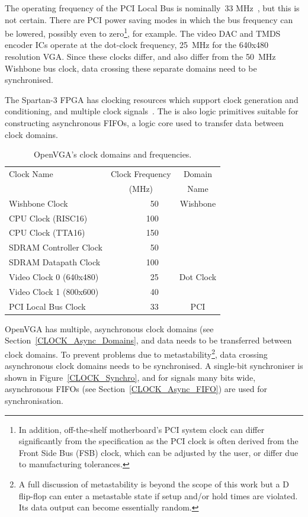 The operating frequency of the PCI Local Bus is nominally~33 MHz~\cite{PCI_Book},
but this is not certain. There are PCI power saving modes in which the bus
frequency can be lowered, possibly even to zero\footnote{In addition,
off-the-shelf motherboard's PCI system clock can differ significantly from the
specification as the PCI clock is often derived from the Front Side Bus (FSB)
clock, which can be adjusted by the user, or differ due to manufacturing
tolerances.\cite{PCI_Book}}, for example. The video DAC and TMDS encoder ICs
operate at the dot-clock frequency, 25~MHz for the 640x480 resolution VGA. Since
these clocks differ, and also differ from the 50~MHz Wishbone bus clock, data
crossing these separate domains need to be synchronised.

The Spartan-3 FPGA has clocking resources which support clock generation and
conditioning, and multiple clock signals~\cite{SP3_DCM}. The is also logic
primitives suitable for constructing asynchronous FIFOs, a logic core used to
transfer data between clock domains.


\begin{table}[h!]
\begin{center}
\begin{tabular}{l | c c r c | c}
Clock Name & \multicolumn{4}{c|}{Clock Frequency} & Domain	\\
& \multicolumn{4}{c|}{(MHz)} & Name	\\
\hline
Wishbone Clock			& & & 50	& & Wishbone \\
CPU Clock (RISC16)		& & & 100	& & \\
CPU Clock (TTA16)		& & & 150	& & \\
SDRAM Controller Clock	& & & 50	& & \\
SDRAM Datapath Clock	& & & 100	& & \\
\hline
Video Clock 0 (640x480)	& & & 25	& & Dot Clock\\
Video Clock 1 (800x600)	& & & 40	& & \\
\hline
PCI Local Bus Clock		& & & 33	& & PCI \\
\end{tabular}
\end{center}
\label{CLOCK_Frequencies}
\caption[OpenVGA clock frequencies]{OpenVGA's clock domains and
frequencies.}
\end{table}

OpenVGA has multiple, asynchronous clock domains (see
Section~\ref{CLOCK_Async_Domains}, and data needs to be transferred between clock
domains. To prevent problems due to metastability\footnote{A full discussion of
metastability is beyond the scope of this work but a D flip-flop can enter a
metastable state if setup and/or hold times are violated. Its data output can
become essentially random.}, data crossing asynchronous clock domains needs to be
synchronised. A single-bit synchroniser is shown in Figure~\ref{CLOCK_Synchro},
and for signals many bits wide, asynchronous FIFOs (see
Section~\ref{CLOCK_Async_FIFO}) are used for synchronisation.


